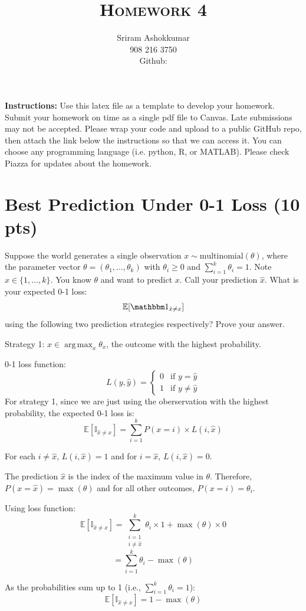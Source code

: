 \documentclass[a4paper]{article}
\title{\textsc{Homework 4}} %
\author{
Sriram Ashokkumar\\
908 216 3750\\
Github: 
}
\date{}
\theoremstyle{definition}
\DeclareMathOperator*{\argmax}{arg\,max}
\def\E{\mathbb E}
\def\ind{\mathbbm 1}
\newenvironment{soln}{
    \leavevmode\color{blue}\ignorespaces
}{}
\begin{document}
\maketitle 


\textbf{Instructions:} Use this latex file as a template to develop your homework. Submit your homework on time as a single pdf file to Canvas. Late submissions may not be accepted. Please wrap your code and upload to a public GitHub repo, then attach the link below the instructions so that we can access it. You can choose any programming language (i.e. python, R, or MATLAB). Please check Piazza for updates about the homework.

\section{Best Prediction Under 0-1 Loss (10 pts)}
Suppose the world generates a single observation $x \sim \mbox{multinomial}(\theta)$, where the parameter vector $\theta=(\theta_1, \ldots, \theta_k)$ with $\theta_i\ge 0$ and $\sum_{i=1}^k \theta_i=1$.  Note $x \in \{1, \ldots, k\}$.
You know $\theta$ and want to predict $x$. 
Call your prediction $\hat x$.  What is your expected 0-1 loss: 
$$\E[\ind_{\hat x \neq x}]$$
using the following two prediction strategies respectively?  Prove your answer.


Strategy 1: $\hat x \in \argmax_x \theta_x$, the outcome with the highest probability.

\begin{soln}
    0-1 loss function:
    \[
    L(y, \hat{y}) = 
    \begin{cases} 
    0 & \text{if } y = \hat{y} \\
    1 & \text{if } y \neq \hat{y} 
    \end{cases}
    \]
    For strategy 1, since we are just using the oberservation with the highest probability, the expected 0-1 loss is:
    \[
    \E[\mathbb{I}_{\hat{x} \neq x}] = \sum_{i=1}^{k} P(x = i) \times L(i, \hat{x})
    \]

    For each $i \neq \hat{x}$, $L(i, \hat{x}) = 1$ and for $i = \hat{x}$, $L(i, \hat{x}) = 0$.

    The prediction $\hat{x}$ is the index of the maximum value in $\theta$. Therefore, $P(x = \hat{x}) = \max(\theta)$ and for all other outcomes, $P(x = i) = \theta_i$.

    Using loss function:
    \[
    \E[\mathbb{I}_{\hat{x} \neq x}] = \sum_{\substack{i=1 \\ i \neq \hat{x}}}^{k} \theta_i \times 1 + \max(\theta) \times 0 
    \]
    \[
    = \sum_{i=1}^{k} \theta_i - \max(\theta)
    \]

    As the probabilities sum up to 1 (i.e., $\sum_{i=1}^{k} \theta_i = 1$):
    \[
    \E[\mathbb{I}_{\hat{x} \neq x}] = 1 - \max(\theta)
    \]
\end{soln}
\end{document}
